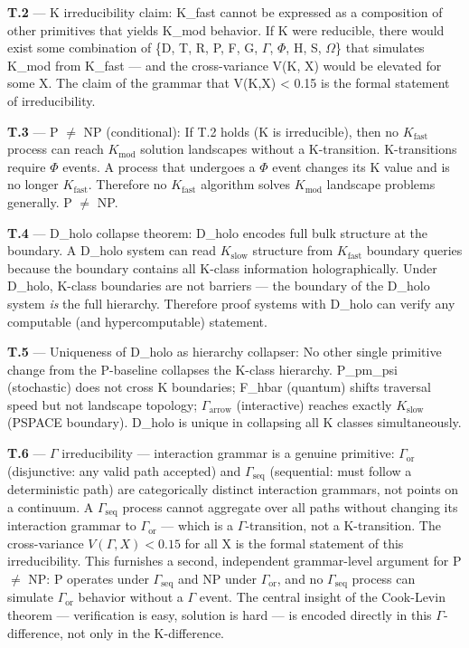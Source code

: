 \documentclass[11pt,a4paper]{article}
\begin{document}
\textbf{T.2} --- K irreducibility claim: K\_fast cannot be expressed as a composition of other primitives that yields K\_mod behavior. If K were reducible, there would exist some combination of \{D, T, R, P, F, G, $\Gamma$, $\Phi$, H, S, $\Omega$\} that simulates K\_mod from K\_fast --- and the cross-variance V(K, X) would be elevated for some X. The claim of the grammar that V(K,X) \textless{} 0.15 is the formal statement of irreducibility.

\textbf{T.3} --- P $\neq$ NP (conditional): If T.2 holds (K is irreducible), then no $K_\text{fast}$ process can reach $K_\text{mod}$ solution landscapes without a K-transition. K-transitions require $\Phi$ events. A process that undergoes a $\Phi$ event changes its K value and is no longer $K_\text{fast}$. Therefore no $K_\text{fast}$ algorithm solves $K_\text{mod}$ landscape problems generally. P $\neq$ NP.

\textbf{T.4} --- D\_holo collapse theorem: D\_holo encodes full bulk structure at the boundary. A D\_holo system can read $K_\text{slow}$ structure from $K_\text{fast}$ boundary queries because the boundary contains all K-class information holographically. Under D\_holo, K-class boundaries are not barriers --- the boundary of the D\_holo system \emph{is} the full hierarchy. Therefore proof systems with D\_holo can verify any computable (and hypercomputable) statement.

\textbf{T.5} --- Uniqueness of D\_holo as hierarchy collapser: No other single primitive change from the P-baseline collapses the K-class hierarchy. P\_pm\_psi (stochastic) does not cross K boundaries; F\_hbar (quantum) shifts traversal speed but not landscape topology; $\Gamma_\text{arrow}$ (interactive) reaches exactly $K_\text{slow}$ (PSPACE boundary). D\_holo is unique in collapsing all K classes simultaneously.

\textbf{T.6} --- $\Gamma$ irreducibility --- interaction grammar is a genuine primitive: $\Gamma_\text{or}$ (disjunctive: any valid path accepted) and $\Gamma_\text{seq}$ (sequential: must follow a deterministic path) are categorically distinct interaction grammars, not points on a continuum. A $\Gamma_\text{seq}$ process cannot aggregate over all paths without changing its interaction grammar to $\Gamma_\text{or}$ --- which is a $\Gamma$-transition, not a K-transition. The cross-variance $V(\Gamma, X) < 0.15$ for all X is the formal statement of this irreducibility. This furnishes a second, independent grammar-level argument for P $\neq$ NP: P operates under $\Gamma_\text{seq}$ and NP under $\Gamma_\text{or}$, and no $\Gamma_\text{seq}$ process can simulate $\Gamma_\text{or}$ behavior without a $\Gamma$ event. The central insight of the Cook-Levin theorem --- verification is easy, solution is hard --- is encoded directly in this $\Gamma$-difference, not only in the K-difference.
\end{document}
